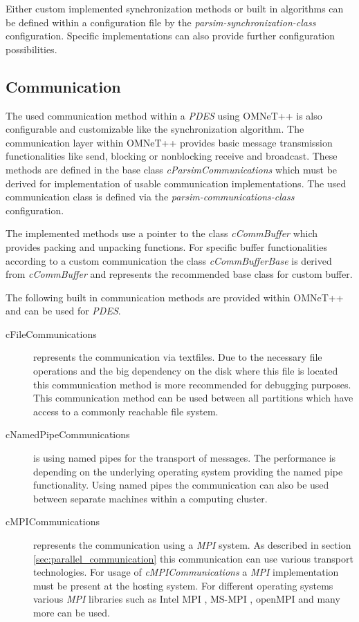 Either custom implemented synchronization methods or built in algorithms can be defined within a configuration file by the \emph{parsim-synchronization-class} configuration.
Specific implementations can also provide further configuration possibilities. \cite[section 16.3.5]{omnet_manual}

\subsection{Communication}
\label{sec:parallel_omnet_comm}
The used communication method within a \emph{PDES} using OMNeT++ is also configurable and customizable like the synchronization algorithm.
The communication layer within OMNeT++ provides basic message transmission functionalities like send, blocking or nonblocking receive and broadcast.
These methods are defined in the base class \emph{cParsimCommunications} which must be derived for implementation of usable communication implementations. 
The used communication class is defined via the \emph{parsim-communications-class} configuration. \cite[section 16.3.5]{omnet_manual}

The implemented methods use a pointer to the class \emph{cCommBuffer} which provides packing and unpacking functions.
For specific buffer functionalities according to a custom communication the class \emph{cCommBufferBase} is derived from \emph{cCommBuffer} and represents the recommended base class for custom buffer. \cite{omnet_par_api}

The following built in communication methods are provided within OMNeT++ and can be used for \emph{PDES}. \cite[section 16.3.5]{omnet_manual} \cite{omnet_par_api}

\begin{description}
    \item[cFileCommunications] represents the communication via textfiles.
    Due to the necessary file operations and the big dependency on the disk where this file is located this communication method is more recommended for debugging purposes.
    This communication method can be used between all partitions which have access to a commonly reachable file system.
    \item[cNamedPipeCommunications] is using named pipes for the transport of messages.
    The performance is depending on the underlying operating system providing the named pipe functionality.
    Using named pipes the communication can also be used between separate machines within a computing cluster.
    \item[cMPICommunications] represents the communication using a \emph{MPI} system.
    As described in section \ref{sec:parallel_communication} this communication can use various transport technologies.
    For usage of \emph{cMPICommunications} a \emph{MPI} implementation must be present at the hosting system.
    For different operating systems various \emph{MPI} libraries such as Intel MPI \cite{intelmpi_hp}, MS-MPI \cite{msmpi_hp}, openMPI \cite{openmpi_hp} and many more can be used.
\end{description}

